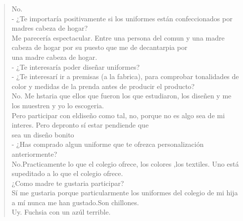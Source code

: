 \documentclass[11pt]{article}
\begin{document}
\begin{verse}
\hspace*{2em}No.\\
\vspace*{1em}
- ¿Te importaría positivamente si los uniformes están confeccionados por madres cabeza de hogar?\\
\vspace*{1em}
\hspace*{2em}Me parecería espectacular. Entre una persona del comun y una madre cabeza de hogar por su puesto que me de decantarpia por\\
\hspace*{2em}una madre cabeza de hogar.\\
\vspace*{1em}
- ¿Te interesaría poder diseñar uniformes?\\
\vspace*{1em}
- ¿Te interesarí ir a premisas (a la fabrica), para comprobar tonalidades de color y medidas de la prenda antes de producir el producto?\\
\hspace*{2em}No. Me hstaria que ellos que fueron los que estudiaron, los diseñen y me los muestren y yo lo escogeria.\\
\hspace*{2em}Pero participar con eldiseño como tal, no, porque no es algo sea de mi interes. Pero depronto sí estar pendiende que\\
\hspace*{2em}sea un diseño bonito\\
- ¿Has comprado algun uniforme que te ofrezca personalización anteriormente?\\
\vspace*{1em}
\hspace*{2em}No.Practicamente lo que el colegio ofrece, los colores ,los textiles. Uno está supeditado a lo que el colegio ofrece.\\
\vspace*{1em}
\hspace*{2em}¿Como madre te gustaria participar?\\
\vspace*{1em}
\hspace*{3em}Sí me gustaria porque particularmente los uniformes del colegio de mi hija a mí nunca me han gustado.Son chillones.\\
\hspace*{3em}Uy. Fuchsia con un azúl terrible.\\
\vspace*{1em}

\end{verse}
\end{document}
